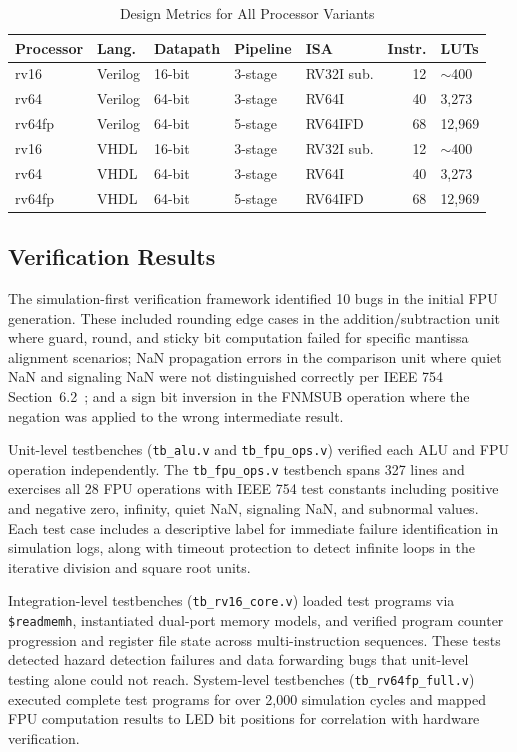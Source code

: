 \documentclass[conference]{IEEEtran}
\begin{document}
\begin{table}[t]
  \centering
  \caption{Design Metrics for All Processor Variants}
  \label{tab:metrics}
  \footnotesize
  \begin{tabular}{@{}lllllrl@{}}
    \toprule
    Processor & Lang. & Datapath & Pipeline & ISA & Instr. & LUTs \\
    \midrule
    rv16   & Verilog & 16-bit & 3-stage & RV32I sub. & 12 & $\sim$400 \\
    rv64   & Verilog & 64-bit & 3-stage & RV64I      & 40 & 3,273 \\
    rv64fp & Verilog & 64-bit & 5-stage & RV64IFD    & 68 & 12,969 \\
    rv16   & VHDL    & 16-bit & 3-stage & RV32I sub. & 12 & $\sim$400 \\
    rv64   & VHDL    & 64-bit & 3-stage & RV64I      & 40 & 3,273 \\
    rv64fp & VHDL    & 64-bit & 5-stage & RV64IFD    & 68 & 12,969 \\
    \bottomrule
  \end{tabular}
\end{table}

\subsection{Verification Results}

The simulation-first verification framework identified 10 bugs in the initial FPU generation. These included rounding edge cases in the addition/subtraction unit where guard, round, and sticky bit computation failed for specific mantissa alignment scenarios; NaN propagation errors in the comparison unit where quiet NaN and signaling NaN were not distinguished correctly per IEEE 754 Section~6.2~\cite{ieee754_2019}; and a sign bit inversion in the FNMSUB operation where the negation was applied to the wrong intermediate result.

Unit-level testbenches (\texttt{tb\_alu.v} and \texttt{tb\_fpu\_ops.v}) verified each ALU and FPU operation independently. The \texttt{tb\_fpu\_ops.v} testbench spans 327 lines and exercises all 28 FPU operations with IEEE 754 test constants including positive and negative zero, infinity, quiet NaN, signaling NaN, and subnormal values. Each test case includes a descriptive label for immediate failure identification in simulation logs, along with timeout protection to detect infinite loops in the iterative division and square root units.

Integration-level testbenches (\texttt{tb\_rv16\_core.v}) loaded test programs via \texttt{\$readmemh}, instantiated dual-port memory models, and verified program counter progression and register file state across multi-instruction sequences. These tests detected hazard detection failures and data forwarding bugs that unit-level testing alone could not reach. System-level testbenches (\texttt{tb\_rv64fp\_full.v}) executed complete test programs for over 2,000 simulation cycles and mapped FPU computation results to LED bit positions for correlation with hardware verification.
\end{document}
